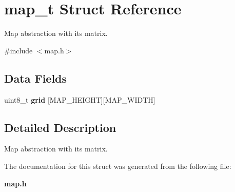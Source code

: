 \section{map\+\_\+t Struct Reference}
\label{structmap__t}


Map abstraction with its matrix.  




{\ttfamily \#include $<$map.\+h$>$}

\subsection*{Data Fields}
\begin{DoxyCompactItemize}
\item 
uint8\+\_\+t {\bfseries grid} [M\+A\+P\+\_\+\+H\+E\+I\+G\+HT][M\+A\+P\+\_\+\+W\+I\+D\+TH]\label{structmap__t_a5ce872ae30568026364d20a2c2ac1e0e}

\end{DoxyCompactItemize}


\subsection{Detailed Description}
Map abstraction with its matrix. 

The documentation for this struct was generated from the following file\+:\begin{DoxyCompactItemize}
\item 
{\bf map.\+h}\end{DoxyCompactItemize}
